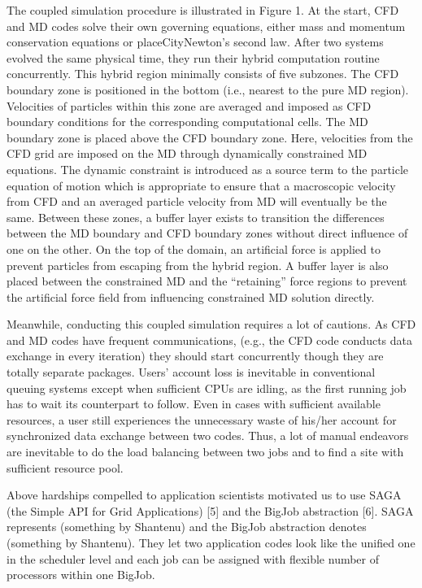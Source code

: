 \documentclass[a4paper]{article}
\begin{document}
The coupled simulation procedure is illustrated in Figure 1. At the start, CFD and MD codes solve their own governing equations, either mass and momentum conservation equations or placeCityNewton's second law. After two systems evolved the same physical time, they run their hybrid computation routine concurrently. This hybrid region minimally consists of five subzones. The CFD boundary zone is positioned in the bottom (i.e., nearest to the pure MD region). Velocities of particles within this zone are averaged and imposed as CFD boundary conditions for the corresponding computational cells. The MD boundary zone is placed above the CFD boundary zone. Here, velocities from the CFD grid are imposed on the MD through dynamically constrained MD equations. The dynamic constraint is introduced as a source term to the particle equation of motion which is appropriate to ensure that a macroscopic velocity from CFD and an averaged particle velocity from MD will eventually be the same. Between these zones, a buffer layer exists to transition the differences between the MD boundary and CFD boundary zones without direct influence of one on the other. On the top of the domain, an artificial force is applied to prevent particles from escaping from the hybrid region. A buffer layer is also placed between the constrained MD and the ``retaining'' force regions to prevent the artificial force field from influencing constrained MD solution directly.

Meanwhile, conducting this coupled simulation requires a lot of cautions. As CFD and MD codes have frequent communications, (e.g., the CFD code conducts data exchange in every iteration) they should start concurrently though they are totally separate packages. Users' account loss is inevitable in conventional queuing systems except when sufficient CPUs are idling, as the first running job has to wait its counterpart to follow. Even in cases with sufficient available resources, a user still experiences the unnecessary waste of his/her account for synchronized data exchange between two codes. Thus, a lot of manual endeavors are inevitable to do the load balancing between two jobs and to find a site with sufficient resource pool.

 Above hardships compelled to application scientists motivated us to use SAGA (the Simple API for Grid Applications) [5] and the BigJob abstraction [6]. SAGA represents (something by Shantenu) and the BigJob abstraction denotes (something by Shantenu). They let two application codes look like the unified one in the scheduler level and each job can be assigned with flexible number of processors within one BigJob.
\end{document}
